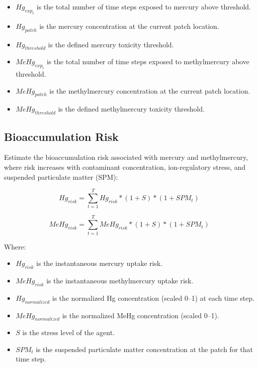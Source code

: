 \documentclass[
]{book}
\providecommand{\tightlist}{%
  \setlength{\itemsep}{0pt}\setlength{\parskip}{0pt}}
\begin{document}
\begin{itemize}
\tightlist
\item
  \(Hg_{exp_t}\) is the total number of time steps exposed to mercury above threshold.\\
\item
  \(Hg_{patch}\) is the mercury concentration at the current patch location.\\
\item
  \(Hg_{threshold}\) is the defined mercury toxicity threshold.\\
\item
  \(MeHg_{exp_t}\) is the total number of time steps exposed to methylmercury above threshold.\\
\item
  \(MeHg_{patch}\) is the methylmercury concentration at the current patch location.\\
\item
  \(MeHg_{threshold}\) is the defined methylmercury toxicity threshold.
\end{itemize}

\subsection{Bioaccumulation Risk}\label{bioaccumulation-risk}

Estimate the bioaccumulation risk associated with mercury and methylmercury, where risk increases with contaminant concentration, ion-regulatory stress, and suspended particulate matter (SPM):

\[
Hg_{risk} = \sum_{t=1}^T Hg_{risk} * (1+S) * (1+SPM_{t})
\]

\[
MeHg_{risk} = \sum_{t=1}^T MeHg_{risk} * (1+S) * (1+SPM_{t})
\]

Where:

\begin{itemize}
\tightlist
\item
  \(Hg_{risk}\) is the instantaneous mercury uptake risk.\\
\item
  \(MeHg_{risk}\) is the instantaneous methylmercury uptake risk.\\
\item
  \(Hg_{normalized}\) is the normalized Hg concentration (scaled 0--1) at each time step.\\
\item
  \(MeHg_{normalized}\) is the normalized MeHg concentration (scaled 0--1).\\
\item
  \(S\) is the stress level of the agent.\\
\item
  \(SPM_{t}\) is the suspended particulate matter concentration at the patch for that time step.
\end{itemize}
\end{document}
